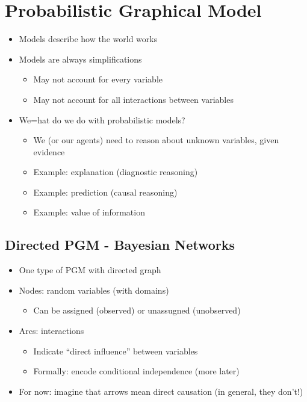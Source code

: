 \documentclass[10pt]{article}
\begin{document}
\section*{Probabilistic Graphical Model}
\begin{itemize}
	\item Models describe how the world works
	\item Models are always simplifications
	\begin{itemize}
	    \item May not account for every variable
	    \item May not account for all interactions between variables
    \end{itemize}
    \item We=hat do we do with probabilistic models?
    \begin{itemize}
	    \item We (or our agents) need to reason about unknown variables, given evidence
	    \item Example: explanation (diagnostic reasoning)
	    \item Example: prediction (causal reasoning)
	    \item Example: value of information
    \end{itemize}
\end{itemize}

\subsection*{Directed PGM - Bayesian Networks}
\begin{itemize}
	\item One type of PGM with directed graph
	\item Nodes: random variables (with domains)
	\begin{itemize}
	    \item Can be assigned (observed) or unassugned (unobserved)
    \end{itemize}
    \item Arcs: interactions
    \begin{itemize}
	    \item Indicate ``direct influence'' between variables
	    \item Formally: encode conditional independence (more later)
    \end{itemize}
    \item For now: imagine that arrows mean direct causation (in general, they don't!)
\end{itemize}
\end{document}
